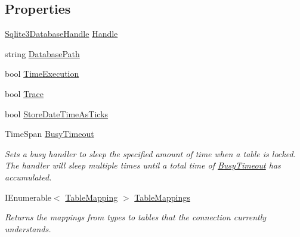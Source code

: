 \subsection*{Properties}
\begin{DoxyCompactItemize}
\item 
\hyperlink{_s_q_lite_8cs_a0137d4c5059675164f7580c64441f40c}{Sqlite3\+Database\+Handle} \hyperlink{class_s_q_lite_1_1_s_q_lite_connection_a504b348bb83df3b51fb49937db4d7804}{Handle}
\item 
string \hyperlink{class_s_q_lite_1_1_s_q_lite_connection_a18b410ed380268c16bb9bdb47b5ad44b}{Database\+Path}
\item 
bool \hyperlink{class_s_q_lite_1_1_s_q_lite_connection_af925b9fddec261394ab29fbbaa25d9a0}{Time\+Execution}
\item 
bool \hyperlink{class_s_q_lite_1_1_s_q_lite_connection_af9e92ae222dba65b2ab761139531118a}{Trace}
\item 
bool \hyperlink{class_s_q_lite_1_1_s_q_lite_connection_a1c24728cf622f060629aac155e2afcaa}{Store\+Date\+Time\+As\+Ticks}
\item 
Time\+Span \hyperlink{class_s_q_lite_1_1_s_q_lite_connection_abb2b70df282aa2f1af07789db65db1dd}{Busy\+Timeout}
\begin{DoxyCompactList}\small\item\em Sets a busy handler to sleep the specified amount of time when a table is locked. The handler will sleep multiple times until a total time of \hyperlink{class_s_q_lite_1_1_s_q_lite_connection_abb2b70df282aa2f1af07789db65db1dd}{Busy\+Timeout} has accumulated. \end{DoxyCompactList}\item 
I\+Enumerable$<$ \hyperlink{class_s_q_lite_1_1_table_mapping}{Table\+Mapping} $>$ \hyperlink{class_s_q_lite_1_1_s_q_lite_connection_ac0c3b1e8f8060ef9777fac08751d159e}{Table\+Mappings}
\begin{DoxyCompactList}\small\item\em Returns the mappings from types to tables that the connection currently understands. \end{DoxyCompactList}\item 

\end{DoxyCompactItemize}

